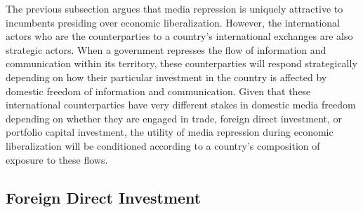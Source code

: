 \documentclass[12pt,a4paper]{article}\usepackage[]{graphicx}\usepackage[]{color}
\begin{document}
The previous subsection argues that media repression is uniquely attractive to incumbents presiding over economic liberalization. However, the international actors who are the counterparties to a country's international exchanges are also strategic actors. When a government represses the flow of information and communication within its territory, these counterparties will respond strategically depending on how their particular investment in the country is affected by domestic freedom of information and communication. Given that these international counterparties have very different stakes in domestic media freedom depending on whether they are engaged in trade, foreign direct investment, or portfolio capital investment, the utility of media repression during economic liberalization will be conditioned according to a country's composition of exposure to these flows.

\subsection{Foreign Direct Investment}
\end{document}
